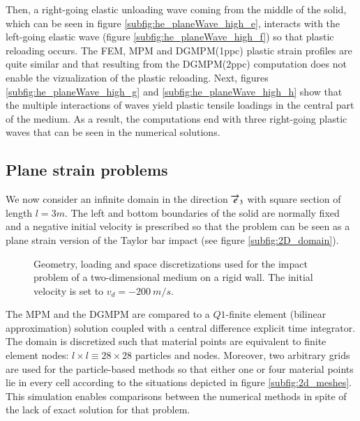 Then, a right-going elastic unloading wave coming from the middle of the solid, which can be seen in figure \ref{subfig:he_planeWave_high_e}, interacts with the left-going elastic wave (figure \ref{subfig:he_planeWave_high_f}) so that plastic reloading occurs.
The FEM, MPM and DGMPM(1ppc) plastic strain profiles are quite similar and that resulting from the DGMPM(2ppc) computation does not enable the vizualization of the plastic reloading.
Next, figures \ref{subfig:he_planeWave_high_g} and \ref{subfig:he_planeWave_high_h} show that the multiple interactions of waves yield plastic tensile loadings in the central part of the medium.
As a result, the computations end with three right-going plastic waves that can be seen in the numerical solutions.


\subsection{Plane strain problems}
\label{sec:plane-strain-problem}
We now consider an infinite domain in the direction ${\overrightarrow{e}}_3$ with square section of length $l=3m$.
The left and bottom boundaries of the solid are normally fixed and a negative initial velocity is prescribed so that the problem can be seen as a plane strain version of the Taylor bar impact (see figure \ref{subfig:2D_domain}).
\begin{figure}[h!]
  \centering
   \qquad
  \caption{Geometry, loading and space discretizations used for the impact problem of a two-dimensional medium on a rigid wall. The initial velocity is set to $v_d=-200 \: m/s$.}
  \label{fig:PS_domain}
\end{figure}

The MPM and the DGMPM are compared to a $Q1$-finite element (bilinear approximation) solution coupled with a central difference explicit time integrator.
The domain is discretized such that material points are equivalent to finite element nodes: $l\times l \equiv 28 \times 28$ particles and nodes.
Moreover, two arbitrary grids are used for the particle-based methods so that either one or four material points lie in every cell according to the situations depicted in figure \ref{subfig:2d_meshes}.
This simulation enables comparisons between the numerical methods in spite of the lack of exact solution for that problem.

